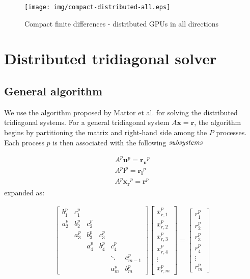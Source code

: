 \begin{figure}
\begin{center}
\texttt{[image: img/compact-distributed-all.eps]}
\caption{Compact finite differences - distributed GPUs in all
    directions}
\label{fig:compact-distributed-all}
\end{center}
\end{figure}

\section{Distributed tridiagonal solver}

\subsection{General algorithm}
\label{subsec:distributed-tridiagonal-algorithm}

We use the algorithm
proposed by Mattor et al. \cite{mattor1995algorithm}
for solving the distributed tridiagonal systems.
For a general tridiagonal system $A\bm{x}=\bm{r}$,
the algorithm begins by partitioning
the matrix and right-hand side among the $P$ processes.
Each process $p$ is then associated with the
following $\emph{subsystems}$

\begin{align}
    & A^p\bm{u}^p = \bm{r_u}^p & \label{eqn:secondary-system-1} \\ 
    & A^p\bm{l}^p = \bm{r_l}^p & \label{eqn:secondary-system-2} \\
    & A^p\bm{x_r}^p = \bm{r}^p & \label{eqn:primary-system} 
\end{align}
%
expanded as:

\begin{align}
& \begin{bmatrix}
b_1^p & c_1^p \\
a_2^p & b_2^p & c_2^p \\
      & a_3^p & b_3^p & c_3^p \\
      &       & a_4^p & b_4^p & c_4^p \\
      &       &       &       &  \ddots & c_{m-1}^p\\
      &       &       &       &     a_{m}^p  & b_{m}^p
\end{bmatrix}
\begin{bmatrix}
x_{r,1}^p \\
x_{r,2}^p \\
x_{r,3}^p \\
x_{r,4}^p \\
\vdots \\
x_{r,m}^p
\end{bmatrix}
=
\begin{bmatrix}
r_1^p \\
r_2^p \\
r_3^p \\
r_4^p \\
\vdots \\
r_m^p
\end{bmatrix} & \label{eqn:primary-system-expanded} \\
\end{align}

